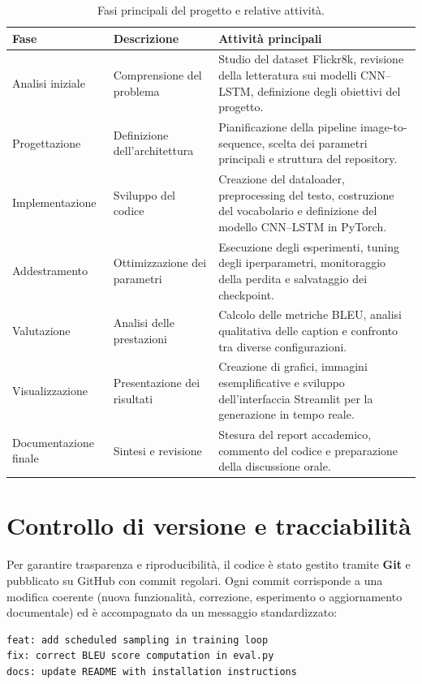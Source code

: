 \documentclass[11pt,a4paper]{report}
\begin{document}
\begin{table}[H]
\centering
\begin{tabular}{@{}llp{8cm}@{}}
\toprule
\textbf{Fase} & \textbf{Descrizione} & \textbf{Attività principali} \\ \midrule
Analisi iniziale & Comprensione del problema & Studio del dataset Flickr8k, revisione della letteratura sui modelli CNN–LSTM, definizione degli obiettivi del progetto. \\
Progettazione & Definizione dell'architettura & Pianificazione della pipeline image-to-sequence, scelta dei parametri principali e struttura del repository. \\
Implementazione & Sviluppo del codice & Creazione del dataloader, preprocessing del testo, costruzione del vocabolario e definizione del modello CNN–LSTM in PyTorch. \\
Addestramento & Ottimizzazione dei parametri & Esecuzione degli esperimenti, tuning degli iperparametri, monitoraggio della perdita e salvataggio dei checkpoint. \\
Valutazione & Analisi delle prestazioni & Calcolo delle metriche BLEU, analisi qualitativa delle caption e confronto tra diverse configurazioni. \\
Visualizzazione & Presentazione dei risultati & Creazione di grafici, immagini esemplificative e sviluppo dell’interfaccia Streamlit per la generazione in tempo reale. \\
Documentazione finale & Sintesi e revisione & Stesura del report accademico, commento del codice e preparazione della discussione orale. \\ \bottomrule
\end{tabular}
\caption{Fasi principali del progetto e relative attività.}
\end{table}

\section{Controllo di versione e tracciabilità}

Per garantire trasparenza e riproducibilità, il codice è stato gestito tramite \textbf{Git} e pubblicato su GitHub con commit regolari.  
Ogni commit corrisponde a una modifica coerente (nuova funzionalità, correzione, esperimento o aggiornamento documentale) ed è accompagnato da un messaggio standardizzato:

\begin{verbatim}
feat: add scheduled sampling in training loop
fix: correct BLEU score computation in eval.py
docs: update README with installation instructions
\end{verbatim}
\end{document}
